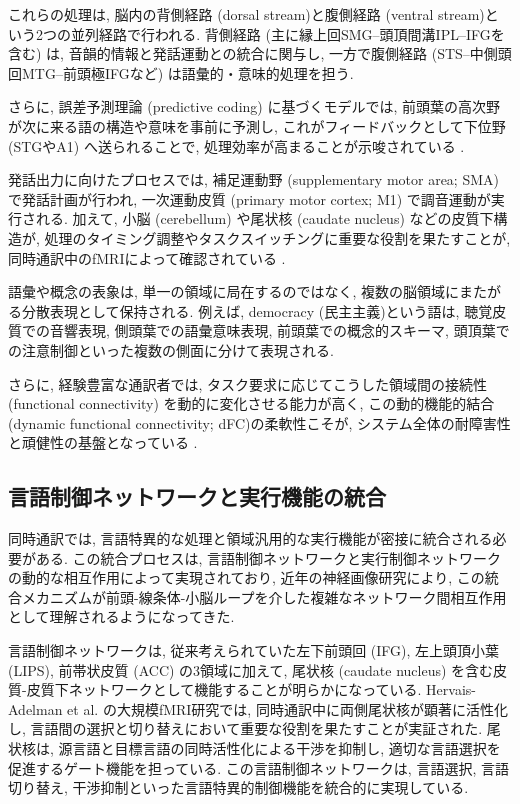 これらの処理は, 脳内の背側経路 (dorsal stream)と腹側経路 (ventral stream)という2つの並列経路で行われる.
背側経路 (主に縁上回SMG--頭頂間溝IPL--IFGを含む) は, 音韻的情報と発話運動との統合に関与し, 一方で腹側経路 (STS--中側頭回MTG--前頭極IFGなど) は語彙的・意味的処理を担う.

さらに, 誤差予測理論 (predictive coding) に基づくモデルでは, 前頭葉の高次野が次に来る語の構造や意味を事前に予測し, これがフィードバックとして下位野 (STGやA1) へ送られることで, 処理効率が高まることが示唆されている \cite{Caucheteux2023Predictive,King2025WhatWhen}.

発話出力に向けたプロセスでは, 補足運動野 (supplementary motor area; SMA) で発話計画が行われ, 一次運動皮質 (primary motor cortex; M1) で調音運動が実行される.
加えて, 小脳 (cerebellum) や尾状核 (caudate nucleus) などの皮質下構造が, 処理のタイミング調整やタスクスイッチングに重要な役割を果たすことが, 同時通訳中のfMRIによって確認されている \cite{HervaisAdelman2015Extreme}.

語彙や概念の表象は, 単一の領域に局在するのではなく, 複数の脳領域にまたがる分散表現として保持される.
例えば, democracy (民主主義)という語は, 聴覚皮質での音響表現, 側頭葉での語彙意味表現, 前頭葉での概念的スキーマ, 頭頂葉での注意制御といった複数の側面に分けて表現される.

さらに, 経験豊富な通訳者では, タスク要求に応じてこうした領域間の接続性 (functional connectivity) を動的に変化させる能力が高く, この動的機能的結合 (dynamic functional connectivity; dFC)の柔軟性こそが, システム全体の耐障害性と頑健性の基盤となっている \cite{Jones2024PhaseSync,Boos2025AccentsEEG}.

\subsection{言語制御ネットワークと実行機能の統合}

同時通訳では, 言語特異的な処理と領域汎用的な実行機能が密接に統合される必要がある.
この統合プロセスは, 言語制御ネットワークと実行制御ネットワークの動的な相互作用によって実現されており, 近年の神経画像研究により, この統合メカニズムが前頭-線条体-小脳ループを介した複雑なネットワーク間相互作用として理解されるようになってきた.

言語制御ネットワークは, 従来考えられていた左下前頭回 (IFG), 左上頭頂小葉 (LIPS), 前帯状皮質 (ACC) の3領域に加えて, 尾状核 (caudate nucleus) を含む皮質-皮質下ネットワークとして機能することが明らかになっている.
Hervais-Adelman et al. \cite{HervaisAdelman2014} の大規模fMRI研究では, 同時通訳中に両側尾状核が顕著に活性化し, 言語間の選択と切り替えにおいて重要な役割を果たすことが実証された.
尾状核は, 源言語と目標言語の同時活性化による干渉を抑制し, 適切な言語選択を促進するゲート機能を担っている.
この言語制御ネットワークは, 言語選択, 言語切り替え, 干渉抑制といった言語特異的制御機能を統合的に実現している.

